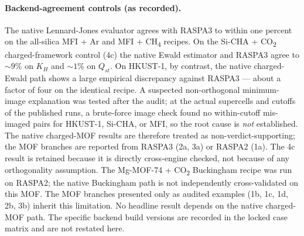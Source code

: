 \paragraph{Backend-agreement controls (as recorded).} The native Lennard-Jones evaluator agrees with RASPA3 to within one percent on the all-silica MFI + Ar and MFI + CH\textsubscript{4} recipes. On the Si-CHA + CO\textsubscript{2} charged-framework control (4c) the native Ewald estimator and RASPA3 agree to \(\sim\!9\%\) on \(K_H\) and \(\sim\!1\%\) on \(Q_{st}\). On HKUST-1, by contrast, the native charged-Ewald path shows a large empirical discrepancy against RASPA3 --- about a factor of four on the identical recipe. A suspected non-orthogonal minimum-image explanation was tested after the audit; at the actual supercells and cutoffs of the published runs, a brute-force image check found no within-cutoff mis-imaged pairs for HKUST-1, Si-CHA, or MFI, so the root cause is \emph{not} established. The native charged-MOF results are therefore treated as non-verdict-supporting; the MOF branches are reported from RASPA3 (2a, 3a) or RASPA2 (1a). The 4c result is retained because it is directly cross-engine checked, not because of any orthogonality assumption. The Mg-MOF-74 + CO\textsubscript{2} Buckingham recipe was run on RASPA2; the native Buckingham path is not independently cross-validated on this MOF. The MOF branches presented only as audited examples (1b, 1c, 1d, 2b, 3b) inherit this limitation. No headline result depends on the native charged-MOF path. The specific backend build versions are recorded in the locked case matrix and are not restated here.
